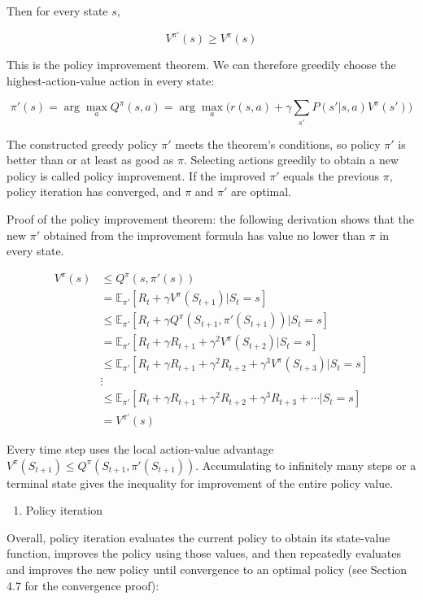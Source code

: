 Then for every state \(s\),

\[
V^{\pi'}(s)\ge V^{\pi}(s)
\]

This is the policy improvement theorem. We can therefore greedily choose the highest-action-value action in every state:

\[
\pi'(s)=\arg\max_a Q^{\pi}(s,a)=\arg\max_a\bigl(r(s,a)+\gamma\sum_{s'}P(s'|s,a)V^{\pi}(s')\bigr)
\]

The constructed greedy policy \(\pi'\) meets the theorem's conditions, so policy \(\pi'\) is better than or at least as good as \(\pi\). Selecting actions greedily to obtain a new policy is called policy improvement. If the improved \(\pi'\) equals the previous \(\pi\), policy iteration has converged, and \(\pi\) and \(\pi'\) are optimal.

Proof of the policy improvement theorem: the following derivation shows that the new \(\pi'\) obtained from the improvement formula has value no lower than \(\pi\) in every state.

\[
\begin{aligned}
V^{\pi}(s) &\le Q^{\pi}(s,\pi'(s))\\
&= \mathbb{E}_{\pi'}[R_t+\gamma V^{\pi}(S_{t+1})|S_t=s]\\
&\le \mathbb{E}_{\pi'}[R_t+\gamma Q^{\pi}(S_{t+1},\pi'(S_{t+1}))|S_t=s]\\
&= \mathbb{E}_{\pi'}[R_t+\gamma R_{t+1}+\gamma^{2}V^{\pi}(S_{t+2})|S_t=s]\\
&\le \mathbb{E}_{\pi'}[R_t+\gamma R_{t+1}+\gamma^{2}R_{t+2}+\gamma^{3}V^{\pi}(S_{t+3})|S_t=s]\\
&\vdots\\
&\le \mathbb{E}_{\pi'}[R_t+\gamma R_{t+1}+\gamma^{2}R_{t+2}+\gamma^{3}R_{t+3}+\cdots|S_t=s]\\
&= V^{\pi'}(s)
\end{aligned}
\]

Every time step uses the local action-value advantage \(V^{\pi}(S_{t+1})\le Q^{\pi}(S_{t+1},\pi'(S_{t+1}))\). Accumulating to infinitely many steps or a terminal state gives the inequality for improvement of the entire policy value.

\begin{enumerate}
\def\labelenumi{(\arabic{enumi})}
\setcounter{enumi}{2}
\tightlist
\item
  Policy iteration
\end{enumerate}

Overall, policy iteration evaluates the current policy to obtain its state-value function, improves the policy using those values, and then repeatedly evaluates and improves the new policy until convergence to an optimal policy (see Section 4.7 for the convergence proof):

